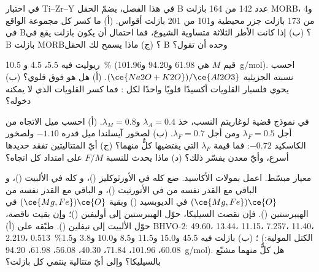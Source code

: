 \begin{exercise}[$\star\star$]\label{exo:b2:magmatic-series:8}
في اختبار Ti--Zr--Y في هذا الفصل، يضمّ الحقل B عدد 142 من 164 بازلت MORB، و4 من 173
بازلت جزر محيطية و101 من 201 بازلت أقواس. (أ) ما كسر كل مجموعة الواقع
في B؟ (ب) إذا كانت الأطر الثلاثة متساوية الشيوع، فما احتمال أن يكون
بازلت يقع في B بازلت MORB؟ (ج) ماذا يسمح لك الحقل B وحده أن تقول؟
\end{exercise}

\begin{exercise}[$\star\star$]\label{exo:b2:magmatic-series:9}
ريوليت فيه  5.5،  4.5 و \qty{10.5}{\percent} (قيم $M$ هي
61.98 و94.20 و\qty{101.96}{g/mol}). احسب نسبته الجزيئية $(\ce{Na2O +
K2O})/\ce{Al2O3}$. (أ) هل هو فوق قلوي؟ (ب) يحوي فلسبار القلويات أكسيدًا قلويًا
واحدًا لكل : فما كسر القلويات الذي لا يمكنه دخوله؟
\end{exercise}

\begin{exercise}[$\star\star\star$]\label{exo:b2:magmatic-series:10}
في نموذج قضية لوغاريتم النسب، خذ $\lambda_A = 0.4$ و$\lambda_M =
0.8$. (أ) احسب ميل الاتجاه من أجل $\lambda_F = 0.5$ ومن أجل $\lambda_F =
0.7$. (ب) لصخور آيسلندا ميل قدره $-1.10$ ولصخور الكاسكيد
$-0.72$: فما قيمة $\lambda_F$ التي يقتضيها كلٌّ منهما؟ (ج) أيّ المتتاليتين تفقد حديدها أسرع،
وأيّ معدن يفسّر ذلك؟ (د) ماذا يحدث للنسبة $F/M$ على امتداد كل اتجاه؟
\end{exercise}

\begin{exercise}[$\star\star\star$]\label{exo:b2:magmatic-series:11}
معيار مبسّط. اعمل بمولات الأكاسيد. ضع  كله في الأورثوكليز
()، و كله في الألبيت ()،
و الباقي مع القدر نفسه من  في الأنورثيت ()،
و الباقي مع القدر نفسه من $(\ce{Mg,Fe})\ce{O}$ في الديوبسيد
() وبقية $(\ce{Mg,Fe})\ce{O}$ في الهيبرستين
(). فإن نقصت السيليكا، حوّل الهيبرستين إلى أوليفين
()؛ وإن بقيت ناقصة، حوّل الألبيت إلى نيفلين
(). طبّقه على (أ) BHVO-2:  49.60،  13.44،
 11.15،  7.257،  11.40،  2.219، 
\qty{0.513}{\percent}؛ (ب) بازلت فيه 45.5 و15.0 و11.5 و8.5 و10.0 و3.8 و1.5 (الكتل
المولية:  60.08،  101.96،  71.84،  40.30، 
56.08،  61.98،  \qty{94.20}{g/mol}). هل كلٌّ منهما مشبّع بالسيليكا؟ وإلى
أيّ متتالية ينتمي كل بازلت؟
\end{exercise}

